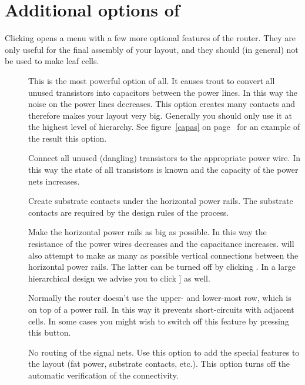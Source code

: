 \section{Additional options of \protect{}}
\label{troutopt}
Clicking  opens a menu with a few more optional features
of the router. They are only useful for the final assembly of your layout, and
they should (in general) not be used to make leaf cells.
\begin{description}
\item[]
This is the most powerful option of all. It causes trout to convert all unused
transistors into capacitors between the power lines. In this way the noise
on the power lines decreases. This option creates many contacts and
therefore makes your layout very big. Generally you should only use it at the 
highest level of hierarchy. See figure~\ref{capas} on page~\pageref{capas} for an
example of the result this option. 
\item[]
Connect all unused (dangling) transistors to the appropriate power wire. In
this way the state of all transistors is known and the capacity of the power
nets increases.
\item[]
Create substrate contacts under the horizontal power rails.  The substrate
contacts are required by the design rules of the process.
\item[]
Make the horizontal power rails as big as possible. In this way the resistance
of the power wires decreases and the capacitance increases.
 will also attempt to make as many as possible vertical
connections between the horizontal power rails.  The latter
can be turned off by clicking .  In a
large hierarchical design we advise you to click
] as well.
\item[]
Normally the router doesn't use the upper- and lower-most row, which is on top
of a power rail. In this way it prevents short-circuits with adjacent cells.
In some cases you might wish to switch off this feature by pressing this
button.
\item[]
No routing of the signal nets. Use this option to add the
special features to the layout (fat power, substrate
contacts, etc.).  This option turns off the automatic
verification of the connectivity.
\item[]

\end{description}
